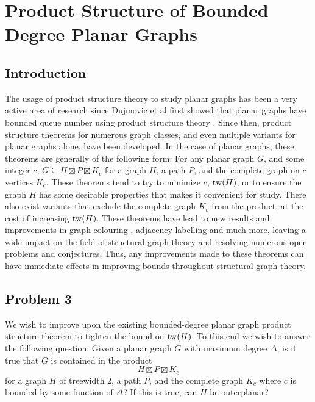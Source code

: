 \documentclass[../main.tex]{subfiles}
\begin{document}
	
	\section{Product Structure of Bounded Degree Planar Graphs}
	\subsection{Introduction}
	The usage of product structure theory to study planar graphs has been a very active area of research since Dujmovic et al first showed that planar graphs have bounded queue number using product structure theory \cite{DJMMUW20}. Since then, product structure theorems for numerous graph classes, and even multiple variants for planar graphs alone, have been developed. 
	In the case of planar graphs, these theorems are generally of the following form: For any planar graph $G$, and some integer $c$, $G\subseteq H \boxtimes P \boxtimes K_c$ for a graph $H$, a path $P$, and the complete graph on $c$ vertices $K_c$. These theorems tend to try to minimize $c$, $\operatorname{tw}(H)$, or to ensure the graph $H$ has some desirable properties that makes it convenient for study. There also exist variants that exclude the complete graph $K_c$ from the product, at the cost of increasing $\operatorname{tw}(H)$.
	These theorems have lead to new results and improvements in graph colouring \cite{DEJWW20}, adjacency labelling \cite{DEJGMM21,EJM23} and much more, leaving a wide impact on the field of structural graph theory and resolving numerous open problems and conjectures. Thus, any improvements made to these theorems can have immediate effects in improving bounds throughout structural graph theory.
	
	\subsection{Problem 3}
	We wish to improve upon the existing bounded-degree planar graph product structure theorem to tighten the bound on $\operatorname{tw}(H)$. To this end we wish to answer the following question: Given a planar graph $G$ with maximum degree $\Delta$, is it true that $G$ is contained in the product $$H\boxtimes P\boxtimes K_c$$ for a graph $H$ of treewidth 2, a path $P$, and the complete graph $K_c$ where $c$ is bounded by some function of $\Delta$? If this is true, can $H$ be outerplanar? 
	
\end{document}
